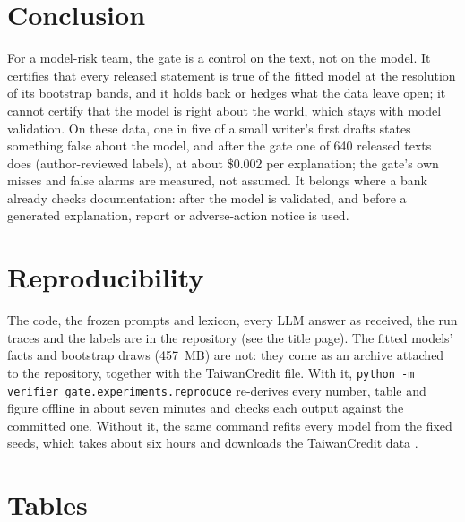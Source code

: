 \documentclass[11pt]{article}
\newcommand{\dsl}[1]{\texttt{#1}}
\begin{document}
\section{Conclusion}

For a model-risk team, the gate is a control on the text, not on the model. It certifies that every released
statement is true of the fitted model at the resolution of its bootstrap bands, and it holds back or hedges what the
data leave open; it cannot certify that the model is right about the world, which stays with model validation. On
these data, one in five of a small writer's first drafts states something false about the model, and after the gate
one of 640 released texts does (author-reviewed labels), at about \$0.002 per explanation; the gate's own misses and
false alarms are measured, not assumed. It belongs where a bank already checks documentation: after the model is
validated, and before a generated explanation, report or adverse-action notice is used.

\section*{Reproducibility}

The code, the frozen prompts and lexicon, every LLM answer as received, the run traces
and the labels are in the repository (see the title page). The fitted models' facts and bootstrap draws (457~MB) are
not: they come as an archive attached to the repository, together with the TaiwanCredit file. With it,
\dsl{python -m verifier\_gate.experiments.reproduce} re-derives every number, table and figure offline in about seven
minutes and checks each output against the committed one. Without it, the same command refits every model from the
fixed seeds, which takes about six hours and downloads the TaiwanCredit data \citep{yeh2009uci}.




\clearpage
\appendix
\section{Tables}

\begin{table}[H]
\centering\footnotesize
\caption{Local claims, about one declined applicant.}
\label{tab:dsl-local}

\end{table}

\begin{table}[H]
\centering\footnotesize
\caption{The lexicon's thresholds (lexicon v2, frozen).}

\end{table}
\end{document}
